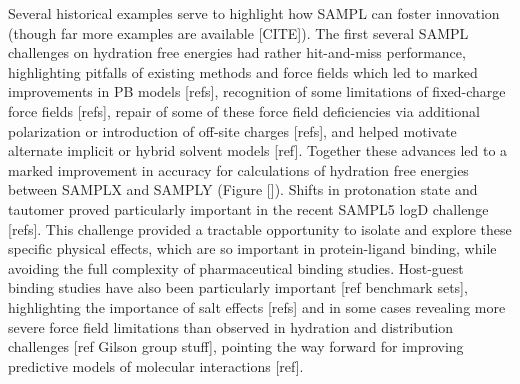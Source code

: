 \documentclass[11pt]{article}
\begin{document}
Several historical examples serve to highlight how SAMPL can foster innovation (though far more examples are available [CITE]). 
The first several SAMPL challenges on hydration free energies had rather hit-and-miss performance, highlighting pitfalls of existing methods and force fields which led to marked improvements in PB models [refs],
 recognition of some limitations of fixed-charge force fields [refs],
repair of some of these force field deficiencies via additional polarization or introduction of off-site charges [refs],
and helped motivate alternate implicit or hybrid solvent models [ref].
Together these advances led to a marked improvement in accuracy for calculations of hydration free energies between SAMPLX and SAMPLY (Figure []).
%
%
Shifts in protonation state and tautomer proved particularly important in the recent SAMPL5 logD challenge [refs].
This challenge provided a tractable opportunity to isolate and explore these specific physical effects, which are so important in protein-ligand binding, while avoiding the full complexity of pharmaceutical binding studies.
Host-guest binding studies have also been particularly important [ref benchmark sets],
highlighting the importance of salt effects [refs]
and in some cases revealing more severe force field limitations than observed in hydration and distribution challenges [ref Gilson group stuff],
pointing the way forward for improving predictive models of molecular interactions [ref].
\end{document}
